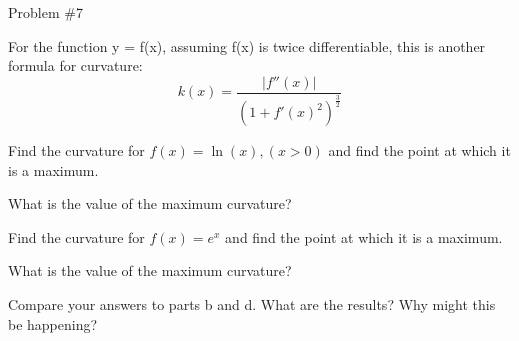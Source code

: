 \begin{sleekbox}[palCoral]{Problem \#7}
    \begin{question}\leavevmode\par\medskip
    For the function y = f(x), assuming f(x) is twice differentiable, this is another formula
    for curvature:
    \[
    k(x) = \frac{|f''(x)|}{\left( 1 + f'(x)^2 \right)^\frac{3}{2}}
    \]
        \begin{parts}
            \item Find the curvature for $f(x) = \ln(x), (x > 0)$ and find the point at which it is a maximum.
            \item What is the value of the maximum curvature?
            \item Find the curvature for $f(x) = e^x$ and find the point at which it is a maximum.
            \item What is the value of the maximum curvature?
            \item Compare your answers to parts b and d. What are the results? Why might this be happening?
        \end{parts}
    \end{question}\leavevmode\par\medskip
    \begin{solution}\leavevmode\par\medskip
        \begin{parts}
            \item 
            \item 
            \item 
            \item 
            \item 
            \item 
        \end{parts}
    \end{solution}
    
\end{sleekbox}

\newpage
